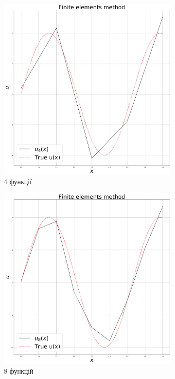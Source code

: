 \begin{figure}[H]
    \begin{subfigure}{.5\textwidth}
    \centering
    \includegraphics[width=.95\linewidth]{fem_4.png}
    \caption{4 функції}
    \end{subfigure}
    \hfill
    \begin{subfigure}{.5\textwidth}
    \centering
    \includegraphics[width=.95\linewidth]{fem_8.png}
    \caption{8 функцій}
    \end{subfigure}
\begin{figure}[H]


\end{figure}
\end{figure}
